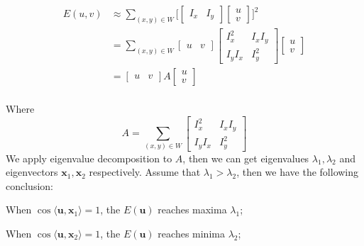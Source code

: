 \documentclass[runningheads]{llncs}
\begin{document}
\begin{align}
    \label{eq:5}
    E(u, v) &\approx \sum_{(x, y) \in W} \Bigg[ 
        \begin{bmatrix}
            I_x &I_y
        \end{bmatrix}
        \begin{bmatrix}
            u \\
            v
        \end{bmatrix}\Bigg]^2 \\
        &= \sum_{(x, y) \in W}
        \begin{bmatrix}
            u &v
        \end{bmatrix}
        \begin{bmatrix}
            I_x^2 &I_xI_y \\
            I_yI_x &I_y^2
        \end{bmatrix}
        \begin{bmatrix}
            u \\
            v
        \end{bmatrix} \\
        &= 
        \begin{bmatrix}
            u &v
        \end{bmatrix}
        A
        \begin{bmatrix}
            u \\
            v
        \end{bmatrix} \\
\end{align}
\par
Where $$A = \sum_{(x, y) \in W} 
\begin{bmatrix}
    I_x^2 &I_xI_y \\
    I_yI_x &I_y^2
\end{bmatrix}$$
We apply eigenvalue decomposition to $A$,
then we can get eigenvalues $\lambda_1, \lambda_2$
and eigenvectors $\boldsymbol{x}_1, \boldsymbol{x}_2$
respectively. Assume that $\lambda_1 > \lambda_2$,
then we have the following conclusion:
\begin{theorem}
    When $\operatorname{cos}\langle \boldsymbol{u} , \boldsymbol{x}_1\rangle = 1$,
    the $E(\boldsymbol{u})$ reaches maxima $\lambda_1$;
    \par\noindent
    When  $\operatorname{cos}\langle \boldsymbol{u} , \boldsymbol{x}_2\rangle = 1$,
    the $E(\boldsymbol{u})$  reaches minima $\lambda_2$;
\end{theorem}
\end{document}
